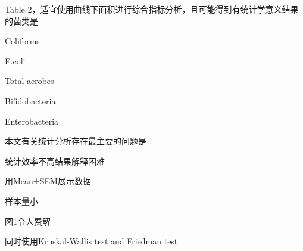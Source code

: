 \par\addvspace{6pt}\noindent\begin{minipage}{\linewidth}


Table 2，适宜使用曲线下面积进行综合指标分析，且可能得到有统计学意义结果的菌类是


\begin{choices}

\item Coliforms

\item E.coli

\item Total aerobes

\item Bifidobacteria

\item Enterobacteria

\end{choices}

\end{minipage}\par\vspace{4pt}

\par\addvspace{6pt}\noindent\begin{minipage}{\linewidth}


本文有关统计分析存在最主要的问题是


\begin{choices}

\item 统计效率不高结果解释困难

\item 用Mean±SEM展示数据

\item 样本量小

\item 图1令人费解

\item 同时使用Kruskal-Wallis test and Friedman test

\end{choices}

\end{minipage}\par\vspace{4pt}

